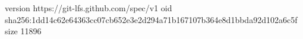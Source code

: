 version https://git-lfs.github.com/spec/v1
oid sha256:1dd14c62e64363cc07cb652e3e2d294a71b167107b364e8d1bbda92d102a6c5f
size 11896
